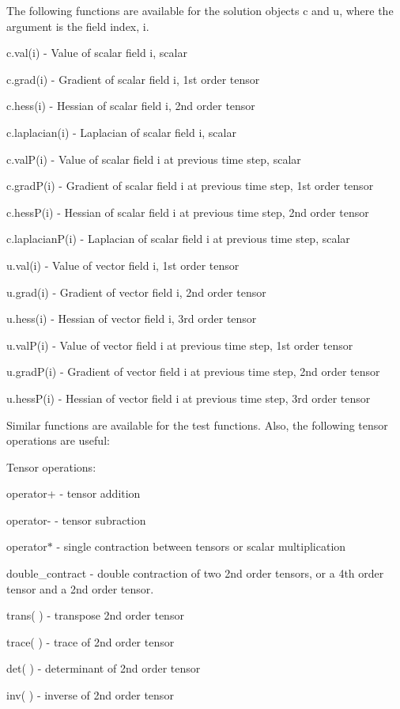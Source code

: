 The following functions are available for the solution objects {\ttfamily c} and {\ttfamily u}, where the argument is the field index, i.

{\ttfamily c.\-val(i)} -\/ Value of scalar field i, scalar \par
{\ttfamily c.\-grad(i)} -\/ Gradient of scalar field i, 1st order tensor \par
{\ttfamily c.\-hess(i)} -\/ Hessian of scalar field i, 2nd order tensor \par
{\ttfamily c.\-laplacian(i)} -\/ Laplacian of scalar field i, scalar \par
{\ttfamily c.\-val\-P(i)} -\/ Value of scalar field i at previous time step, scalar \par
{\ttfamily c.\-grad\-P(i)} -\/ Gradient of scalar field i at previous time step, 1st order tensor \par
{\ttfamily c.\-hess\-P(i)} -\/ Hessian of scalar field i at previous time step, 2nd order tensor \par
{\ttfamily c.\-laplacian\-P(i)} -\/ Laplacian of scalar field i at previous time step, scalar

{\ttfamily u.\-val(i)} -\/ Value of vector field i, 1st order tensor \par
{\ttfamily u.\-grad(i)} -\/ Gradient of vector field i, 2nd order tensor \par
{\ttfamily u.\-hess(i)} -\/ Hessian of vector field i, 3rd order tensor \par
{\ttfamily u.\-val\-P(i)} -\/ Value of vector field i at previous time step, 1st order tensor \par
{\ttfamily u.\-grad\-P(i)} -\/ Gradient of vector field i at previous time step, 2nd order tensor \par
{\ttfamily u.\-hess\-P(i)} -\/ Hessian of vector field i at previous time step, 3rd order tensor

Similar functions are available for the test functions. Also, the following tensor operations are useful\-:

Tensor operations\-: \par
{\ttfamily operator+} -\/ tensor addition \par
{\ttfamily operator-\/} -\/ tensor subraction \par
{\ttfamily operator$\ast$} -\/ single contraction between tensors or scalar multiplication \par
{\ttfamily double\-\_\-contract} -\/ double contraction of two 2nd order tensors, or a 4th order tensor and a 2nd order tensor. \par
{\ttfamily trans( )} -\/ transpose 2nd order tensor \par
{\ttfamily trace( )} -\/ trace of 2nd order tensor \par
{\ttfamily det( )} -\/ determinant of 2nd order tensor \par
{\ttfamily inv( )} -\/ inverse of 2nd order tensor \par



